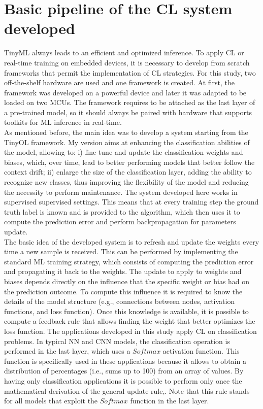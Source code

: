 \documentclass[12pt]{report}
\begin{document}
\section{Basic pipeline of the CL system developed}
\label{basic_system}
TinyML always leads to an efficient and optimized inference. To apply CL or real-time training on embedded devices, it is necessary to develop from scratch frameworks that permit the implementation of CL strategies. For this study, two off-the-shelf hardware are used and one framework is created. At first, the framework was developed on a powerful device and later it was adapted to be loaded on two MCUs. The framework requires to be attached as the last layer of a pre-trained model, so it should always be paired with hardware that supports toolkits for ML inference in real-time.\\
As mentioned before, the main idea was to develop a system starting from the TinyOL framework. My version aims at enhancing the classification abilities of the model, allowing to: i) fine tune and update the classification weights and biases, which, over time, lead to better performing models that better follow the context drift; ii) enlarge the size of the classification layer, adding the ability to recognize new classes, thus improving the flexibility of the model and reducing the necessity to perform maintenance. The system developed here works in supervised supervised settings. This means that at every training step the ground truth label is known and is provided to the algorithm, which then uses it to compute the prediction error and perform backpropagation for parameters update.\\
The basic idea of the developed system is to refresh and update the weights every time a new sample is received. This can be performed by implementing the standard ML training strategy, which consists of computing the prediction error and propagating it back to the weights. The update to apply to weights and biases depends directly on the influence that the specific weight or bias had on the prediction outcome. To compute this influence it is required to know the details of the model structure (e.g., connections between nodes, activation functions, and loss function). Once this knowledge is available, it is possible to compute a feedback rule that allows finding the weight that better optimizes the loss function.
The applications developed in this study apply CL on classification problems. In typical NN and CNN models, the classification operation is performed in the last layer, which uses a $Softmax$ activation function. This function is specifically used in these applications because it allows to obtain a distribution of percentages (i.e., sums up to 100) from an array of values. By having only classification applications it is possible to perform only once the mathematical derivation of the general update rule,. Note that this rule stands for all models that exploit the $Softmax$ function in the last layer.\\
\end{document}
